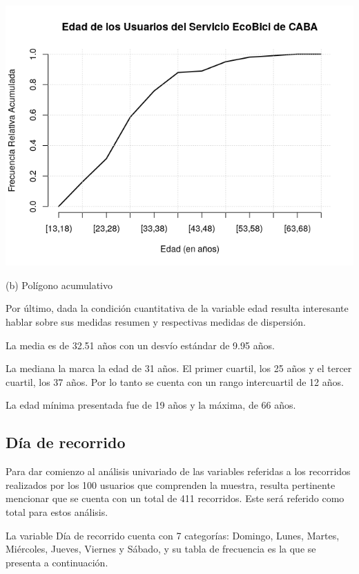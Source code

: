 \documentclass[11pt]{article}
\begin{document}
    \begin{center}
    \includegraphics[scale=0.55]{PoligAcumEdad.png}
    \vspace{-4mm}

    (b) Pol\'igono acumulativo
    \end{center}

    Por \'ultimo, dada la condici\'on cuantitativa de la variable edad resulta interesante hablar sobre sus medidas resumen y respectivas medidas de dispersi\'on. 

    La media es de 32.51 a\~{n}os con un desv\'io est\'andar de 9.95 a\~{n}os.

    La mediana la marca la edad de 31 a\~{n}os. El primer cuartil, los 25 a\~{n}os y el tercer cuartil, los 37 a\~{n}os. Por lo tanto se cuenta con un rango intercuartil de 12 a\~{n}os. 

    La edad m\'inima presentada fue de 19 a\~{n}os y la m\'axima, de 66 a\~{n}os.


  \subsection{D\'ia de recorrido}
  Para dar comienzo al an\'alisis univariado de las variables referidas a los recorridos realizados por los 100 usuarios que 
  comprenden la muestra, resulta pertinente mencionar que se cuenta con un total de 411 recorridos. Este ser\'a referido como total para estos an\'alisis. 

  La variable D\'ia de recorrido cuenta con 7 categor\'ias: Domingo, Lunes, Martes, Mi\'ercoles, Jueves, Viernes y S\'abado, y su tabla de frecuencia es la que se presenta a continuaci\'on. 
\end{document}
